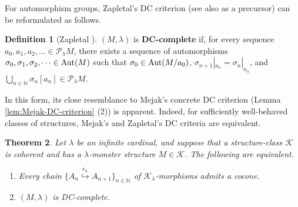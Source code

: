 \documentclass[10pt]{amsart}
\numberwithin{equation}{section}
\theoremstyle{plain}
\newtheorem{theorem}{Theorem}[section]
\theoremstyle{definition}
\newtheorem{definition}[theorem]{Definition}
\newcommand{\N}{\mathbb{N}}
\newcommand{\K}{\mathcal{K}}
\newcommand{\embed}{\hookrightarrow}
\newcommand{\embedge}[1]{\overset{#1}{\embed}}
\begin{document}
For automorphism groups, Zapletal's DC criterion (see also \cite{KaSc24} as a precursor) can be reformulated as follows.

\begin{definition}[Zapletal {\cite[Definition 4.2]{Zap26}}]\label{def:Zap-DC-completeness}
$(M,\lambda)$ is {\bf DC-complete} if, for every sequence $a_0,a_1,a_2,\dots\in\mathcal{P}_\lambda M$, there exists a sequence of automorphisms $\sigma_0,\sigma_1,\sigma_2,\dots\in{\rm Aut}(M)$ such that $\sigma_0\in{\rm Aut}(M/a_0)$, $\sigma_{n+1}|_{a_n}=\sigma_n|_{a_n}$, and $\bigcup_{n\in\N}\sigma_n[a_n]\in\mathcal{P}_\lambda M$.
\end{definition}

In this form, its close resemblance to Mejak's concrete DC criterion (Lemma \ref{lem:Mejak-DC-criterion} (2)) is apparent.
Indeed, for sufficiently well-behaved classes of structures, Mejak's and Zapletal's DC criteria are equivalent.

\begin{theorem}\label{thm:DC-completeness}
Let $\lambda$ be an infinite cardinal, and suppose that a structure-class $\K$ is coherent and has a $\lambda$-monster structure $M\in\K$.
The following are equivalent.
\begin{enumerate}
\item Every chain $\{A_n\embedge{e_n}A_{n+1}\}_{n\in\N}$ of $\K_\lambda$-morphisms admits a cocone.
\item $(M,\lambda)$ is DC-complete.
\end{enumerate}
\end{theorem}
\end{document}
